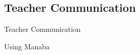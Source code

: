 %
%
%
%


\subsection{Teacher Communication}
\begin{frame}{Teacher Communication}
\end{frame}

\begin{frame}{Using Manaba}
\end{frame}

%
%
%
%


